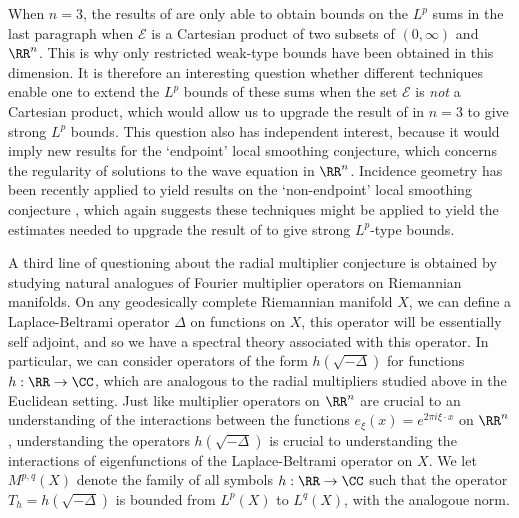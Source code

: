 When $n = 3$, the results of \cite{Cladek} are only able to obtain bounds on the $L^p$ sums in the last paragraph when $\mathcal{E}$ is a Cartesian product of two subsets of $(0,\infty)$ and $\RR^n$. This is why only restricted weak-type bounds have been obtained in this dimension. It is therefore an interesting question whether different techniques enable one to extend the $L^p$ bounds of these sums when the set $\mathcal{E}$ is \emph{not} a Cartesian product, which would allow us to upgrade the result of \cite{Cladek} in $n = 3$ to give strong $L^p$ bounds. This question also has independent interest, because it would imply new results for the `endpoint' local smoothing conjecture, which concerns the regularity of solutions to the wave equation in $\RR^n$. Incidence geometry has been recently applied to yield results on the `non-endpoint' local smoothing conjecture \cite{GuthandWangandZhang}, which again suggests these techniques might be applied to yield the estimates needed to upgrade the result of \cite{Cladek} to give strong $L^p$-type bounds.

A third line of questioning about the radial multiplier conjecture is obtained by studying natural analogues of Fourier multiplier operators on Riemannian manifolds. On any geodesically complete Riemannian manifold $X$, we can define a Laplace-Beltrami operator $\Delta$ on functions on $X$, this operator will be essentially self adjoint, and so we have a spectral theory associated with this operator. In particular, we can consider operators of the form $h(\sqrt{-\Delta})$ for functions $h: \RR \to \CC$, which are analogous to the radial multipliers studied above in the Euclidean setting. Just like multiplier operators on $\RR^n$ are crucial to an understanding of the interactions between the functions $e_\xi(x) = e^{2 \pi i \xi \cdot x}$ on $\RR^n$, understanding the operators $h(\sqrt{-\Delta})$ is crucial to understanding the interactions of eigenfunctions of the Laplace-Beltrami operator on $X$. We let $M^{p,q}(X)$ denote the family of all symbols $h: \RR \to \CC$ such that the operator $T_h = h(\sqrt{-\Delta})$ is bounded from $L^p(X)$ to $L^q(X)$, with the analogoue norm.

